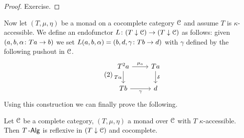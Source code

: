 \documentclass[a4paper,11pt,oneside,openany]{scrbook}
\begin{document}
\begin{proof}
	Exercise.
\end{proof}
Now let $ (T,\mu,\eta) $ be a monad on a cocomplete category $ \operatorname{\mathcal{C}} $ and assume $
T $ is $ \kappa $-accessible.
We define an endofunctor $ L \colon (T\downarrow\operatorname{\mathcal{C}}) \to (T\downarrow\operatorname{\mathcal{C}}) $ as
follows: given $ (a,b,\alpha\colon Ta \to b) $ we set $ L(a,b,\alpha) =
(b,d,\gamma \colon Tb \to d) $ with $ \gamma $ defined by the following pushout
in $ \operatorname{\mathcal{C}} $.
\begin{displaymath}\tag{2}\label{fork2}
	\begin{tikzcd}
		T^2 a \arrow[r, "\mu_a"]\arrow[d, "T\alpha"'] &  Ta \arrow[d, "\delta"]\\
		Tb \arrow[r,"\gamma"'] & d
	\end{tikzcd}
\end{displaymath}
Using this construction we can finally prove the following.
\begin{thm}
	Let $\operatorname{\mathcal{C}}$ be a complete category, $(T,\mu,\eta)$ a monad over $\operatorname{\mathcal{C}}$ with $T$
    $\kappa$-accessible. Then $T\operatorname{-\mathsf{Alg}}$ is reflexive in $(T\downarrow\operatorname{\mathcal{C}})$ and
    cocomplete.
\end{thm}
\end{document}
